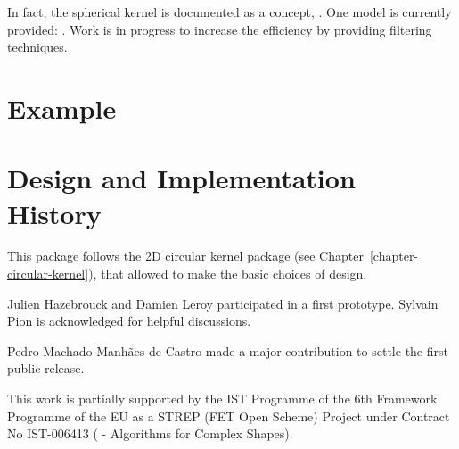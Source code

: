In fact, the spherical kernel is documented as a concept,
. One model is currently provided: 
.
Work is in progress to increase the efficiency by providing filtering
techniques.

\section{Example}


\section{Design and Implementation History}

This package follows the 2D circular kernel package (see
Chapter~\ref{chapter-circular-kernel}), that allowed to make the basic
choices of design.

Julien Hazebrouck and Damien Leroy participated in a first
prototype. Sylvain Pion is acknowledged for helpful discussions.

Pedro Machado Manh\~{a}es de Castro made a major contribution to
settle the first public release.

This work is partially supported by the IST Programme of the 6th
Framework Programme of the EU as a STREP (FET Open Scheme) Project
under Contract No IST-006413 ( -
Algorithms for Complex Shapes).

